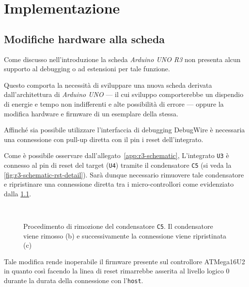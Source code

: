 \chapter{Implementazione}



\section{Modifiche hardware alla scheda}\label{s:dw-board-mod}

Come discusso nell'introduzione la scheda \textit{Arduino UNO R3} non presenta alcun supporto al debugging o ad estensioni per tale funzione.

Questo comporta la necessità di sviluppare una nuova scheda derivata dall'architettura di \textit{Arduino UNO} --- il cui sviluppo comporterebbe un dispendio di energie e tempo non indifferenti e alte possibilità di errore --- oppure la modifica hardware e firmware di un esemplare della stessa.

Affinché sia possibile utilizzare l'interfaccia di debugging DebugWire è necessaria una connessione con pull-up diretta con il pin i reset dell'integrato.

Come è possibile osservare dall'allegato~\ref{app:r3-schematic}, L'integrato \texttt{U3} è connesso al pin di reset del target (\texttt{U4}) tramite il condensatore \texttt{C5} (si veda la \cref{fig:r3-schematic-rst-detail}). Sarà dunque necessario rimuovere tale condensatore e ripristinare una connessione diretta tra i micro-controllori come evidenziato dalla \cref{fig:remove-c5}.

\begin{figure}[t]
    \hfill
    \begin{minipage}{.45\textwidth}
    \end{minipage}
    \begin{minipage}{.45\textwidth}
         \\
    \end{minipage}
    \hfill
    \caption[]{Procedimento di rimozione del condensatore \texttt{C5}. Il condensatore viene rimosso (b) e successivamente la connessione viene ripristinata (c)}\label{fig:remove-c5}
\end{figure}

Tale modifica rende inoperabile il firmware presente sul controllore ATMega16U2 in quanto così facendo la linea di reset rimarrebbe asserita al livello logico 0 durante la durata della connessione con l'\texttt{host}.

